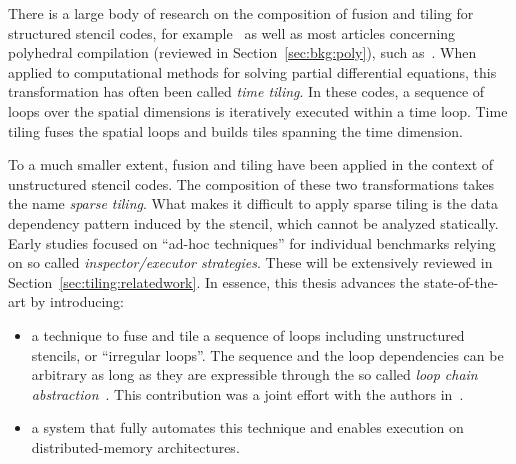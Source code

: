 There is a large body of research on the composition of fusion and tiling for structured stencil codes, for example~\cite{cohen-timetiling,timetiling-gpu,hierarchical-tiling} as well as most articles concerning polyhedral compilation (reviewed in Section~\ref{sec:bkg:poly}), such as~\cite{pluto}. When applied to computational methods for solving partial differential equations, this transformation has often been called {\em time tiling}. In these codes, a sequence of loops over the spatial dimensions is iteratively executed within a time loop. Time tiling fuses the spatial loops and builds tiles spanning the time dimension.

To a much smaller extent, fusion and tiling have been applied in the context of unstructured stencil codes. The composition of these two transformations takes the name {\em sparse tiling}. What makes it difficult to apply sparse tiling is the data dependency pattern induced by the stencil, which cannot be analyzed statically. Early studies focused on ``ad-hoc techniques'' for individual benchmarks relying on so called {\em inspector/executor strategies}. These will be extensively reviewed in Section~\ref{sec:tiling:relatedwork}. In essence, this thesis advances the state-of-the-art by introducing:
\begin{itemize}
\item a technique to fuse and tile a sequence of loops including unstructured stencils, or ``irregular loops''. The sequence and the loop dependencies can be arbitrary as long as they are expressible through the so called {\em loop chain abstraction}~\cite{ST-KriegerHIPS2013}. This contribution was a joint effort with the authors in~\cite{st-paper}.
\item a system that fully automates this technique and enables execution on distributed-memory architectures.
\end{itemize}
 
